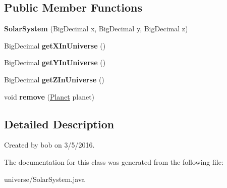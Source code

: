 \subsection*{Public Member Functions}
\begin{DoxyCompactItemize}
\item 
{\bfseries Solar\+System} (Big\+Decimal x, Big\+Decimal y, Big\+Decimal z)\hypertarget{classuniverse_1_1_solar_system_ab1e7ea9bfd202411fcbcb143de8ff71e}{}\label{classuniverse_1_1_solar_system_ab1e7ea9bfd202411fcbcb143de8ff71e}

\item 
Big\+Decimal {\bfseries get\+X\+In\+Universe} ()\hypertarget{classuniverse_1_1_solar_system_aeb8ee18781b08fd4016a7dc9ffd09865}{}\label{classuniverse_1_1_solar_system_aeb8ee18781b08fd4016a7dc9ffd09865}

\item 
Big\+Decimal {\bfseries get\+Y\+In\+Universe} ()\hypertarget{classuniverse_1_1_solar_system_a2a428b67c8d3d7d0b00e21599cab0886}{}\label{classuniverse_1_1_solar_system_a2a428b67c8d3d7d0b00e21599cab0886}

\item 
Big\+Decimal {\bfseries get\+Z\+In\+Universe} ()\hypertarget{classuniverse_1_1_solar_system_a9c1c62cabb7b7193eaaa92632fb4e847}{}\label{classuniverse_1_1_solar_system_a9c1c62cabb7b7193eaaa92632fb4e847}

\item 
void {\bfseries remove} (\hyperlink{classplanets_1_1_planet}{Planet} planet)\hypertarget{classuniverse_1_1_solar_system_aea836d31c96f1b69e3b36efd18ba6393}{}\label{classuniverse_1_1_solar_system_aea836d31c96f1b69e3b36efd18ba6393}

\end{DoxyCompactItemize}


\subsection{Detailed Description}
Created by bob on 3/5/2016. 

The documentation for this class was generated from the following file\+:\begin{DoxyCompactItemize}
\item 
universe/Solar\+System.\+java\end{DoxyCompactItemize}
